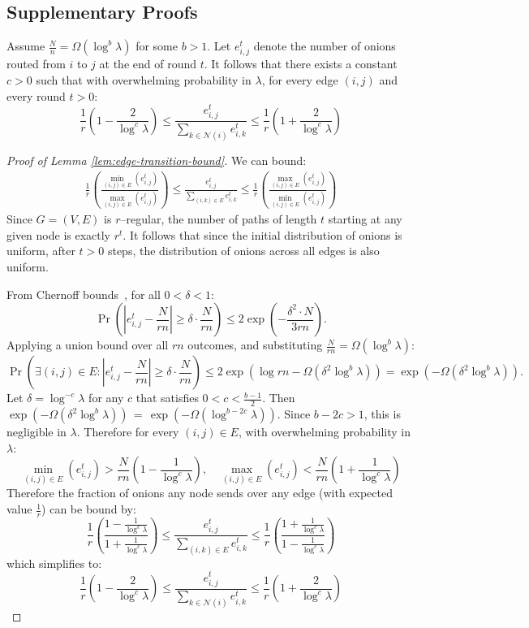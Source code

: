 \subsection{Supplementary Proofs} \label{sec:proofs}
\begin{lemma} \label{lem:edge-transition-bound}
    Assume $\frac{N}{n} = \Omega(\log^b \lambda)$ for some $b > 1$. Let $e^t_{i,j}$ denote the number of onions routed from $i$ to $j$ at the end of round $t$. It follows that there exists a constant $c > 0$ such that with overwhelming probability in $\lambda$, for every edge $(i,j)$ and every round $t > 0$:
    $$
    \frac{1}{r}\left(1 - \frac{2}{\log^c \lambda}\right) \leq\frac{e^t_{i,j}}{\sum_{k \in \mathcal{N}(i)} e^{t}_{i,k}} \leq \frac{1}{r}\left(1 + \frac{2}{\log^c \lambda}\right)
    $$
\end{lemma}
\begin{proof}[Proof of Lemma \ref{lem:edge-transition-bound}]
We can bound:
\begin{align*}
    \frac{1}{r}\left(\frac{\min_{(i,j) \in E} (e^t_{i,j})}{\max_{(i,j) \in E} (e^t_{i,j})}\right) \leq \frac{e^t_{i,j}}{\sum_{(i,k) \in E} e^{t}_{i,k}} \leq \frac{1}{r}\left(\frac{\max_{(i,j) \in E} (e^t_{i,j})}{\min_{(i,j) \in E} (e^t_{i,j})}\right)
\end{align*}
Since $G = (V,E)$ is $r$–regular, the number of paths of length $t$ starting at any given node is exactly $r^t$. It follows that since the initial distribution of onions is uniform, after $t > 0$ steps, the distribution of onions across all edges is also uniform. 

From Chernoff bounds~\cite[Cor.~4.6]{MU05}, for all $0 < \delta < 1$:
$$
\Pr\left(|e^t_{i,j} - \frac{N}{rn}| \geq \delta \cdot \frac{N}{rn} \right) \leq 2 \exp(-\frac{\delta^2 \cdot N}{3rn}).
$$
Applying a union bound over all $rn$ outcomes, and substituting $\frac{N}{rn} = \Omega(\log^{b} \lambda)$:
$$
\Pr\left(\exists (i,j) \in E: |e^t_{i,j} - \frac{N}{rn}| \geq \delta \cdot \frac{N}{rn} \right) \leq 2 \exp(\log rn -\Omega(\delta^2\log^{b} \lambda)) = \exp(-\Omega(\delta^2\log^{b} \lambda)).
$$
Let $\delta = \log^{-c} \lambda$ for any $c$ that satisfies $0 < c < \frac{b - 1}{2}$. Then $\exp(-\Omega(\delta^2\log^{b} \lambda)) \, = \, \exp(-\Omega(\log^{b - 2c} \lambda))$. Since $b - 2c > 1$, this is negligible in $\lambda$.
Therefore for every $(i,j) \in E$, with overwhelming probability in $\lambda$:
$$
\min_{(i,j) \in E} (e^t_{i,j}) > \frac{N}{rn}\left(1 - \frac{1}{\log^c \lambda}\right), \quad\max_{(i,j) \in E} (e^t_{i,j}) < \frac{N}{rn}\left(1 + \frac{1}{\log^c \lambda}\right)
$$
Therefore the fraction of onions any node sends over any edge (with expected value $\frac{1}{r}$) can be bound by:
$$
\frac{1}{r}\left(\frac{1 - \frac{1}{\log^c \lambda}}{1 + \frac{1}{\log^c \lambda}}\right) \leq \frac{e^t_{i,j}}{\sum_{(i,k) \in E} e^{t}_{i,k}} \leq \frac{1}{r}\left(\frac{1 + \frac{1}{\log^c \lambda}}{1 - \frac{1}{\log^c \lambda}}\right)
$$
which simplifies to:
$$
\frac{1}{r}\left(1 - \frac{2}{\log^c \lambda}\right) \leq\frac{e^t_{i,j}}{\sum_{k \in \mathcal{N}(i)} e^{t}_{i,k}} \leq \frac{1}{r}\left(1 + \frac{2}{\log^c \lambda}\right)
$$
\end{proof}


